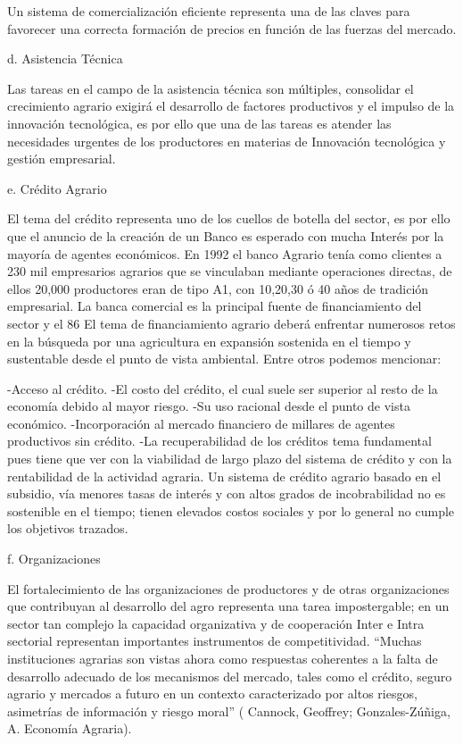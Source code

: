 \documentclass{report}
\begin{document}
Un sistema de comercialización eficiente representa una de las claves para favorecer una correcta formación de precios en función de las fuerzas del mercado.

d. Asistencia Técnica

Las tareas en el campo de la asistencia técnica son múltiples, consolidar el
crecimiento agrario exigirá el desarrollo de factores productivos y el impulso
de la innovación tecnológica, es por ello que una de las tareas es atender las
necesidades urgentes de los productores en materias de Innovación tecnológica y
gestión empresarial.

e. Crédito Agrario

El tema del crédito representa uno de los cuellos de botella del sector, es por ello que el anuncio de la creación de un Banco es esperado con mucha Interés por la mayoría de agentes económicos.
En 1992 el banco Agrario tenía como clientes a 230 mil empresarios agrarios que se vinculaban mediante operaciones directas, de ellos 20,000 productores eran de tipo A1, con 10,20,30 ó 40 años de tradición empresarial.
La banca comercial es la principal fuente de financiamiento del sector y el 86%
El tema de financiamiento agrario deberá enfrentar numerosos retos en la búsqueda por una agricultura en expansión sostenida en el tiempo y sustentable desde el punto de vista ambiental. Entre otros podemos mencionar:

-Acceso al crédito.
-El costo del crédito, el cual suele ser superior al resto de la economía debido al mayor riesgo.
-Su uso racional desde el punto de vista económico.
-Incorporación al mercado financiero de millares de agentes productivos sin crédito.
-La recuperabilidad de los créditos tema fundamental pues tiene que ver con la viabilidad de largo plazo del sistema de crédito y con la rentabilidad de la actividad agraria. Un sistema de crédito agrario basado en el subsidio, vía menores tasas de interés y con altos grados de incobrabilidad no es sostenible en el tiempo; tienen elevados costos sociales y por lo general no cumple los objetivos trazados.

f. Organizaciones

El fortalecimiento de las organizaciones de productores y de otras organizaciones que contribuyan al desarrollo del agro representa una tarea impostergable; en un sector tan complejo la capacidad organizativa y de cooperación Inter e Intra sectorial representan importantes instrumentos de competitividad. “Muchas instituciones agrarias son vistas ahora como respuestas coherentes a la falta de desarrollo adecuado de los mecanismos del mercado, tales como el crédito, seguro agrario y mercados a futuro en un contexto caracterizado por altos riesgos, asimetrías de información y riesgo moral” ( Cannock, Geoffrey; Gonzales-Zúñiga, A. Economía Agraria).
\end{document}
